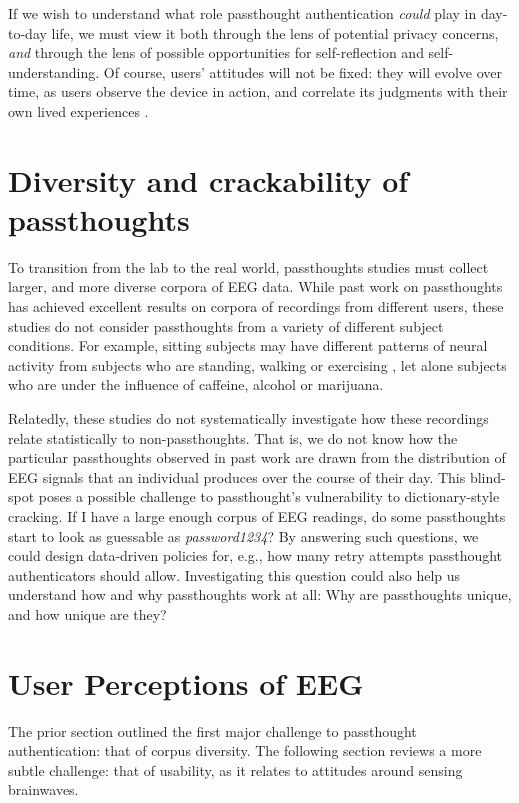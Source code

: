 \documentclass[sigconf]{acmart}
\begin{document}
If we wish to understand what role passthought authentication \emph{could} play in day-to-day life,
we must view it both through the lens of potential privacy concerns, \emph{and} through the lens of possible opportunities for self-reflection and self-understanding. 
Of course, users' attitudes will not be fixed: they will evolve over time, as users observe the device in action, and correlate its judgments with their own lived experiences \cite{Nafus2016}.

\section{Diversity and crackability of passthoughts}
\label{sec:org8b8d857}

To transition from the lab to the real world,
passthoughts studies must collect larger, and more diverse corpora of EEG data.
While past work on passthoughts has achieved excellent results on corpora of recordings from different users, 
these studies do not consider passthoughts from a variety of different subject conditions.
For example, sitting subjects may have different patterns of neural activity from subjects who are standing, walking or exercising \cite{Thibault2016a},
let alone subjects who are under the influence of caffeine, alcohol or marijuana.

Relatedly, these studies do not systematically investigate how these recordings relate statistically to non-passthoughts.
That is, we do not know how the particular passthoughts observed in past work are drawn from the distribution of EEG signals that an individual produces over the course of their day.
This blind-spot poses a possible challenge to passthought's vulnerability to dictionary-style cracking.
If I have a large enough corpus of EEG readings, do some passthoughts start to look as guessable as \emph{password1234}?
By answering such questions, we could design data-driven policies for, e.g., how many retry attempts passthought authenticators should allow.
Investigating this question could also help us understand how and why passthoughts work at all: Why are passthoughts unique, and how unique are they?

\section{User Perceptions of EEG}
\label{sec:orgd436f39}

The prior section outlined the first major challenge to passthought authentication: that of corpus diversity.
The following section reviews a more subtle challenge: that of usability, as it relates to attitudes around sensing brainwaves.
\end{document}
